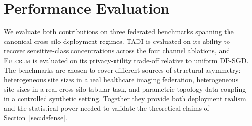 \documentclass[letterpaper,journal]{IEEEtran}
\newcommand{\cf}{cf.\xspace}
\newcommand{\TADI}{\textsc{TADI}\xspace}
\newcommand{\Fulcrum}{\textsc{Fulcrum}\xspace}
\newcommand{\Dset}{\mathcal{D}}
\newcommand{\Tmax}{T_{\max}}
\begin{document}

\section{Performance Evaluation}
\label{sec:experiments}

We evaluate both contributions on three federated benchmarks spanning the canonical cross-silo deployment regimes. \TADI is evaluated on its ability to recover sensitive-class concentrations across the four channel ablations, and \Fulcrum is evaluated on its privacy-utility trade-off relative to uniform DP-SGD. The benchmarks are chosen to
cover different sources of structural asymmetry:  heterogeneous site sizes in a real healthcare imaging federation, heterogeneous site sizes in a real cross-silo tabular task, and parametric topology-data coupling in a controlled synthetic setting. Together they provide both
deployment realism and the statistical power needed to validate the theoretical claims of Section~\ref{sec:defense}.
\end{document}
